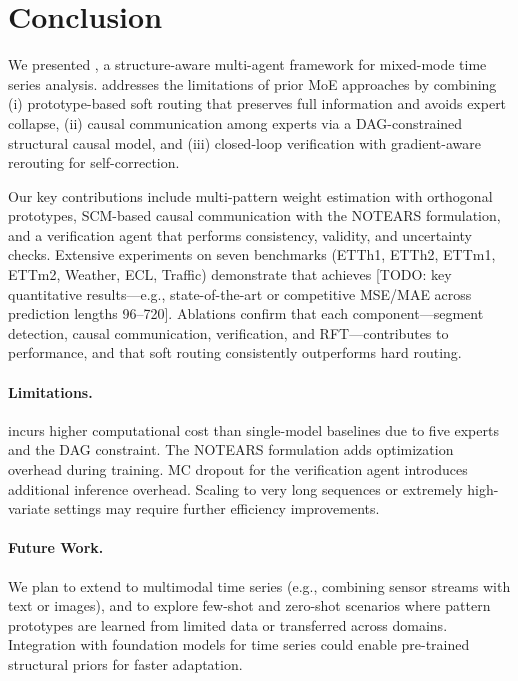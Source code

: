 \section{Conclusion}

We presented \model, a structure-aware multi-agent framework for mixed-mode time series analysis. \model addresses the limitations of prior MoE approaches by combining (i) prototype-based soft routing that preserves full information and avoids expert collapse, (ii) causal communication among experts via a DAG-constrained structural causal model, and (iii) closed-loop verification with gradient-aware rerouting for self-correction.

Our key contributions include multi-pattern weight estimation with orthogonal prototypes, SCM-based causal communication with the NOTEARS formulation, and a verification agent that performs consistency, validity, and uncertainty checks. Extensive experiments on seven benchmarks (ETTh1, ETTh2, ETTm1, ETTm2, Weather, ECL, Traffic) demonstrate that \model achieves [TODO: key quantitative results---e.g., state-of-the-art or competitive MSE/MAE across prediction lengths 96--720]. Ablations confirm that each component---segment detection, causal communication, verification, and RFT---contributes to performance, and that soft routing consistently outperforms hard routing.

\paragraph{Limitations.}
\model incurs higher computational cost than single-model baselines due to five experts and the DAG constraint. The NOTEARS formulation adds optimization overhead during training. MC dropout for the verification agent introduces additional inference overhead. Scaling to very long sequences or extremely high-variate settings may require further efficiency improvements.

\paragraph{Future Work.}
We plan to extend \model to multimodal time series (e.g., combining sensor streams with text or images), and to explore few-shot and zero-shot scenarios where pattern prototypes are learned from limited data or transferred across domains. Integration with foundation models for time series could enable pre-trained structural priors for faster adaptation.

